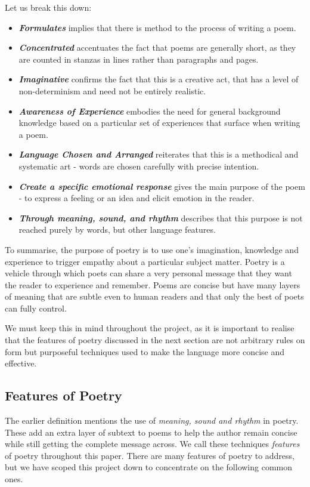 Let us break this down:
\begin{itemize}
\item{\textit{\textbf{Formulates}} implies that there is method to the process of writing a poem.}
\item{\textit{\textbf{Concentrated}} accentuates the fact that poems are generally short, as they are counted in stanzas in lines rather than paragraphs and pages.}
\item{\textit{\textbf{Imaginative}} confirms the fact that this is a creative act, that has a level of non-determinism and need not be entirely realistic.}
\item{\textit{\textbf{Awareness of Experience}} embodies the need for general background knowledge based on a particular set of experiences that surface when writing a poem.}
\item{\textit{\textbf{Language Chosen and Arranged}} reiterates that this is a methodical and systematic art - words are chosen carefully with precise intention.}
\item{\textit{\textbf{Create a specific emotional response}} gives the main purpose of the poem - to express a feeling or an idea and elicit emotion in the reader.}
\item{\textit{\textbf{Through meaning, sound, and rhythm}} describes that this purpose is not reached purely by words, but other language features.}
\end{itemize}

To summarise, the purpose of poetry is to use one's imagination, knowledge and experience to trigger empathy about a particular subject matter. Poetry is a vehicle through which poets can share a very personal message that they want the reader to experience and remember. Poems are concise but have many layers of meaning that are subtle even to human readers and that only the best of poets can fully control. 

We must keep this in mind throughout the project, as it is important to realise that the features of poetry discussed in the next section are not arbitrary rules on form but purposeful techniques used to make the language more concise and effective.

\subsection{Features of Poetry}
\label{sec:features}

The earlier definition mentions the use of \textit{meaning, sound and rhythm} in poetry. These add an extra layer of subtext to poems to help the author remain concise while still getting the complete message across. We call these techniques \textit{features} of poetry throughout this paper. There are many features of poetry to address, but we have scoped this project down to concentrate on the following common ones.

